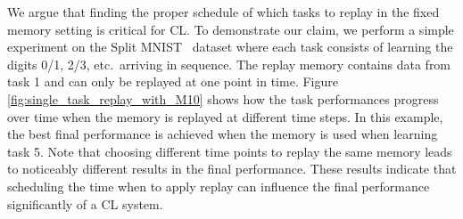 We 
argue that finding the proper schedule of which tasks to replay in the fixed memory setting is critical for CL. To demonstrate our claim, we perform a simple experiment on the Split MNIST~ dataset where each task consists of learning the digits 0/1, 2/3, etc.\ arriving in sequence.
The replay memory contains data from task 1 and can only be replayed at one point in time.
Figure \ref{fig:single_task_replay_with_M10} shows how the task performances progress over time when the memory is replayed at different time steps. In this example, the best final performance is achieved when the memory is used when learning task 5.
Note that choosing different time points to replay the same memory leads to noticeably different results in the final performance. 
These results indicate that scheduling the time when to apply replay can influence the final performance significantly of a CL system.  

